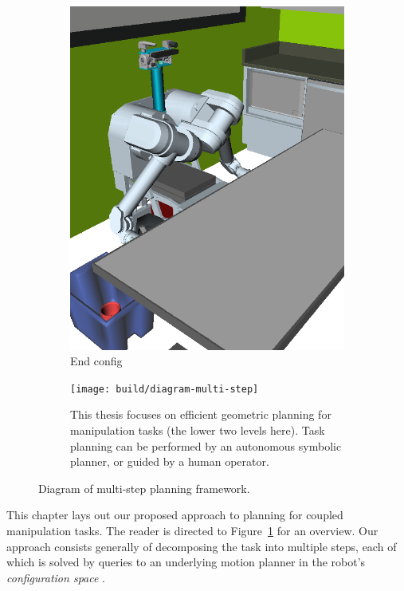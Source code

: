 {\begin{figure}
\begin{widepage}
\begin{subfigure}[t]{0.19\linewidth}
      \includegraphics[width=\columnwidth]{figs/testherb-e.png}
      \caption{End config}
   \end{subfigure}

   \vspace{0.3cm}

   \begin{subfigure}[t]{\linewidth}
      \centering
      \texttt{[image: build/diagram-multi-step]}
      \caption{This thesis focuses on efficient geometric planning
         for manipulation tasks (the lower two levels here).
         Task planning can be performed by an autonomous
         symbolic planner,
         or guided by a human operator.}
   \end{subfigure}

   \caption{Diagram of multi-step planning framework.}
   \label{fig:xx-diagram-multi-step}
\end{widepage}
\end{figure}
}

This chapter lays out our proposed approach
to planning for coupled manipulation tasks.
The reader is directed to Figure~\ref{fig:xx-diagram-multi-step}
for an overview.
Our approach consists generally of decomposing the task into
multiple steps,
each of which is solved by queries to an underlying motion
planner in the robot's
\emph{configuration space} \cite{lozanoperez1983cspace}.

